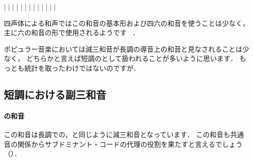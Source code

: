 \documentclass[dvipdfmx,uplatex,b5paper,openany,jbase=12Q,nomag*,textwidth-limit=44%
               ]{gachimuchi}
\begin{document}
\begin{floatMusic}[pos=ht]
  \Startpiece%
  \znotes|\en
  \NOTes
  |%
  \en\bar
  \NOTEs
  |%
  \en\doublebar
  \NOTes
  \sk%
  |%
  \en\bar
  \NOTEs
  |%
  \en\doublebar
  \NOTes
  |%
  \en\bar
  \NOTEs
  |%
  \en\doublebar
  \NOTes
  |%
  \en\bar
  \NOTEs
  |%
  \en\setdoublebar
  \endpiece%
\end{floatMusic}


\begin{Yodan}
四声体による和声ではこの和音の基本形および四六の和音を使うことは少なく，主に六の和音の形で使用されるようです
\cite[p.25]{chMOROI1a}~\cite[p.80]{chSHIMAOKA1i}．
\end{Yodan}
\begin{Yodan}
ポピュラー音楽においては減三和音が長調の導音上の和音と見なされることは少なく，
どちらかと言えば短調の\Gnii\Dimt として扱われることが多いように思います．
もっとも統計を取ったわけではないのですが．
\end{Yodan}

\subsection{短調における副三和音}
\paragraph{\Gnii\Dimt の和音}
この和音は長調での\Gnii\Dimt ，\Gnvii\Dimt と同じように減三和音となっています．
この和音も共通音の関係からサブドミナント・コードの代理の役割を果たすと言えるでしょう
（）．
\end{document}
